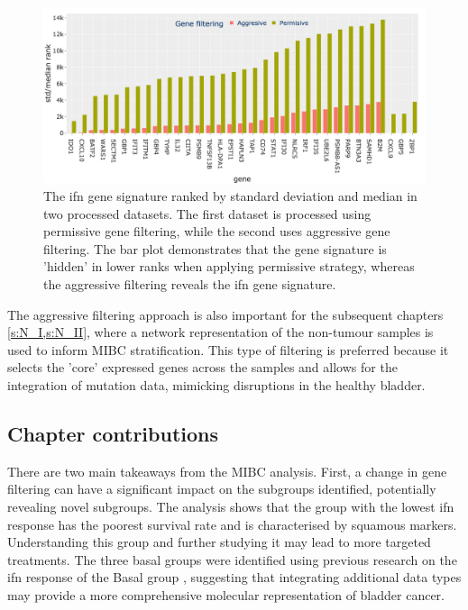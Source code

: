 \begin{figure}[!htb]
    \centering
    \includegraphics[width=1.0\textwidth,keepaspectratio]{Sections/Gene_Sel/ifng_ranks.png}
    \caption[Std/median ranks of the genes in \acrlong{ifn} signature]{The \acrshort{ifn} gene signature \citep{Baker2022-bj} ranked by standard deviation and median in two processed datasets. The first dataset is processed using permissive gene filtering, while the second uses aggressive gene filtering. The bar plot demonstrates that the gene signature is 'hidden' in lower ranks when applying permissive strategy, whereas the aggressive filtering reveals the \acrshort{ifn} gene signature.}
      \label{fig:ifng_rank_genes}
\end{figure}


The aggressive filtering approach is also important for the subsequent chapters \cref{s:N_I,s:N_II}, where a network representation of the non-tumour samples is used to inform MIBC stratification. This type of filtering is preferred because it selects the 'core' expressed genes across the samples and allows for the integration of mutation data, mimicking disruptions in the healthy bladder.

\subsection{Chapter contributions}

There are two main takeaways from the MIBC analysis. First, a change in gene filtering can have a significant impact on the subgroups identified, potentially revealing novel subgroups. The analysis shows that the group with the lowest \acrlong{ifn} response has the poorest survival rate and is characterised by squamous markers. Understanding this group and further studying it may lead to more targeted treatments. The three basal groups were identified using previous research on the \acrshort{ifn} response of the Basal group \citep{Baker2022-bj}, suggesting that integrating additional data types may provide a more comprehensive molecular representation of bladder cancer.

